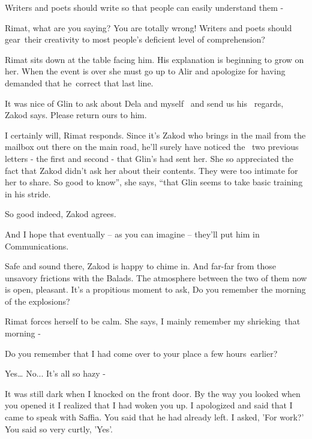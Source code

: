\documentclass[letterpaper]{article}
\begin{document}
{\textquotedbl}Writers and poets should write so that people can easily understand them -{\textquotedbl} 

{\textquotedbl}Rimat, what are you saying? You are totally wrong! Writers and poets should gear~their creativity to most
people's deficient level of comprehension?{\textquotedbl} 

Rimat sits down at the table facing him. His explanation is beginning to grow on her. When the event is over she must go
up to Alir and apologize for having demanded that he~correct{ }that last line.

{\textquotedbl}It was nice of Glin to ask about Dela and{ }myself \ and send us his~
regards,{\textquotedbl} Zakod says. {\textquotedbl}Please return ours to him.{\textquotedbl} 

{\textquotedbl}I certainly will,{\textquotedbl} Rimat responds. Since it's Zakod who brings in the mail from the mailbox
out there on the main road, he'll surely have noticed the \ two previous letters - the first and second - that Glin's
had sent her. She so appreciated the fact that Zakod didn't ask her about their contents. They were too intimate for
her to share. {\textquotedbl}So good to know'', she says, ``that Glin seems to take basic training in his
stride.{\textquotedbl} 

{\textquotedbl}So good indeed,{\textquotedbl} Zakod agrees. 

{\textquotedbl}And I hope that eventually -- as you can imagine -- they'll put him in Communications.{\textquotedbl} 

{\textquotedbl}Safe and sound there,{\textquotedbl} Zakod is happy to chime in. {\textquotedbl}And far-far from those
unsavory frictions with the Balads.{\textquotedbl} The atmosphere between the two of them now is open, pleasant. It's a
propitious moment to ask, {\textquotedbl}Do you remember the morning of the explosions?{\textquotedbl} 

Rimat forces herself to be calm. She says, {\textquotedbl}I mainly remember my shrieking~that morning -{\textquotedbl} 

{\textquotedbl}Do you remember that I had come over to your place a few hours~earlier?{\textquotedbl} 

{\textquotedbl}Yes{\dots} No... It's all so hazy -{\textquotedbl} 

{\textquotedbl}It was still dark when I knocked on the front door. By the way you looked when you opened it I realized
that I had woken you up. I apologized and said that I came to speak with Saffia. You said that he had already left. I
asked, 'For work?' You said so very curtly, 'Yes'.{\textquotedbl} 
\end{document}
